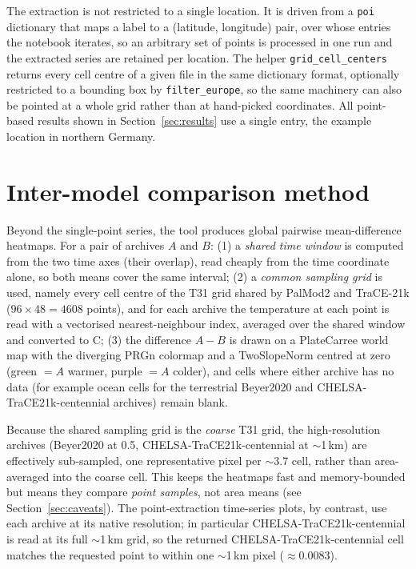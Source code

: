 \documentclass{isprs}
\newcommand{\dg}{\textdegree}
\newcommand{\degC}{\textdegree C}
\newcommand{\tabbr}[1]{\texttt{#1}}
\begin{document}
The extraction is not restricted to a single location. It is driven from a \tabbr{poi} dictionary that maps a label to a (latitude, longitude) pair, over whose entries the notebook iterates, so an arbitrary set of points is processed in one run and the extracted series are retained per location. The helper \tabbr{grid\_cell\_centers} returns every cell centre of a given file in the same dictionary format, optionally restricted to a bounding box by \tabbr{filter\_europe}, so the same machinery can also be pointed at a whole grid rather than at hand-picked coordinates. All point-based results shown in Section~\ref{sec:results} use a single entry, the example location in northern Germany.

\section{Inter-model comparison method}
\label{sec:comparison}
Beyond the single-point series, the tool produces global pairwise mean-difference heatmaps. For a pair of archives $A$ and $B$: (1) a \emph{shared time window} is computed from the two time axes (their overlap), read cheaply from the time coordinate alone, so both means cover the same interval; (2) a \emph{common sampling grid} is used, namely every cell centre of the T31 grid shared by PalMod2 and TraCE-21k ($96\times48 = 4608$ points), and for each archive the temperature at each point is read with a vectorised nearest-neighbour index, averaged over the shared window and converted to \degC; (3) the difference $A-B$ is drawn on a PlateCarree world map with the diverging PRGn colormap and a TwoSlopeNorm centred at zero (green $=A$ warmer, purple $=A$ colder), and cells where either archive has no data (for example ocean cells for the terrestrial Beyer2020 and CHELSA-TraCE21k-centennial archives) remain blank.

Because the shared sampling grid is the \emph{coarse} T31 grid, the high-resolution archives (Beyer2020 at 0.5\dg, CHELSA-TraCE21k-centennial at $\sim$1\,km) are effectively sub-sampled, one representative pixel per $\sim$3.7\dg{} cell, rather than area-averaged into the coarse cell. This keeps the heatmaps fast and memory-bounded but means they compare \emph{point samples}, not area means (see Section~\ref{sec:caveats}). The point-extraction time-series plots, by contrast, use each archive at its native resolution; in particular CHELSA-TraCE21k-centennial is read at its full $\sim$1\,km grid, so the returned CHELSA-TraCE21k-centennial cell matches the requested point to within one $\sim$1\,km pixel ($\approx 0.0083$\dg).
\end{document}
